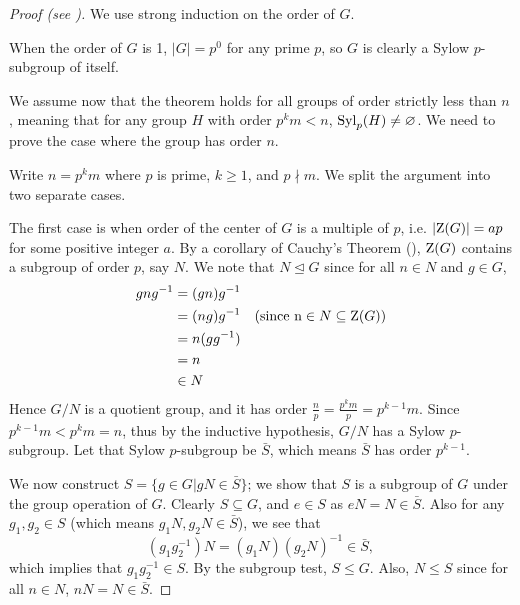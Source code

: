 \begin{proof}[Proof (see {\cite[pp.~1--3]{mann_2011}})]
    We use strong induction on the order of $G$.

    When the order of $G$ is 1, $|G| = p^0$ for any prime $p$, so $G$ is clearly a Sylow $p$-subgroup of itself.

    We assume now that the theorem holds for all groups of order strictly less than $n$, meaning that for any group $H$ with order $p^k m < n$, $\mathrm{Syl}_{p}(H) \neq \varnothing$. We need to prove the case where the group has order $n$.

    Write $n = p^k m$ where $p$ is prime, $k \geq 1$, and $p \nmid m$. We split the argument into two separate cases.

    The first case is when order of the center of $G$ is a multiple of $p$, i.e. $|\mathrm{Z}(G)| = ap$ for some positive integer $a$. By a corollary of Cauchy's Theorem (), $\mathrm{Z}(G)$ contains a subgroup of order $p$, say $N$. We note that $N \unlhd G$ since for all $n \in N$ and $g \in G$,
    \begin{align*}
        gng^{-1} &= (gn)g^{-1}\\
        &= (ng)g^{-1} & (\text{since n} \in N \subseteq \mathrm{Z}(G))\\
        &= n(gg^{-1})\\
        &= n\\
        &\in N
    \end{align*}
    Hence $G/N$ is a quotient group, and it has order $\frac np = \frac{p^km}{p} = p^{k-1}m$. Since $p^{k-1}m < p^km = n$, thus by the inductive hypothesis, $G/N$ has a Sylow $p$-subgroup. Let that Sylow $p$-subgroup be $\bar{S}$, which means $\bar{S}$ has order $p^{k-1}$.

    We now construct $S = \{g \in G \vert gN \in \bar{S}\}$; we show that $S$ is a subgroup of $G$ under the group operation of $G$. Clearly $S \subseteq G$, and $e \in S$ as $eN = N \in \bar{S}$. Also for any $g_1, g_2 \in S$ (which means $g_1N, g_2N \in \bar{S}$), we see that
    \[
        (g_1g_2^{-1})N = (g_1N)(g_2N)^{-1} \in \bar{S},
    \]
    which implies that $g_1g_2^{-1} \in S$. By the subgroup test, $S \leq G$. Also, $N \leq S$ since for all $n \in N$, $nN = N \in \bar{S}$.


\end{proof}
